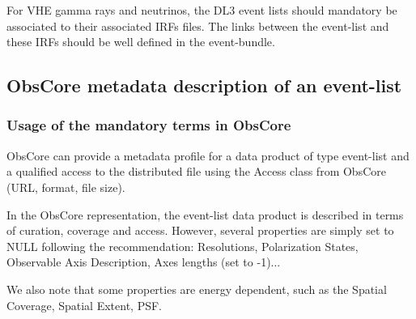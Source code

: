 \documentclass[11pt,a4paper]{ivoa}
\begin{document}
For VHE gamma rays and neutrinos, the DL3 event lists should mandatory be associated to their associated IRFs files. The
links between the event-list and these IRFs should be well defined in the event-bundle.


\subsection{ObsCore metadata description of an event-list}
\label{sec:obscore}

%


\subsubsection{Usage of the mandatory terms in ObsCore}

ObsCore \citep{2017ivoa.spec.0509L} can provide a metadata profile for a data product of type event-list and a qualified access to the distributed file using the Access class from ObsCore (URL, format, file size).

In the ObsCore representation, the event-list data product is described in terms of curation, coverage and access. However, several properties are simply set to NULL following the recommendation: Resolutions, Polarization States, Observable Axis Description, Axes lengths (set to -1)...

We also note that some properties are energy dependent, such as the Spatial Coverage, Spatial Extent, PSF.

\end{document}
